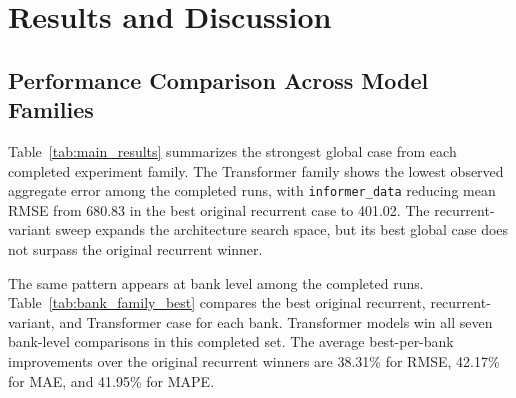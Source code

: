 \section{Results and Discussion}

\subsection{Performance Comparison Across Model Families}
Table~\ref{tab:main_results} summarizes the strongest global case from each completed experiment family. The Transformer family shows the lowest observed aggregate error among the completed runs, with \texttt{informer\_data} reducing mean RMSE from 680.83 in the best original recurrent case to 401.02. The recurrent-variant sweep expands the architecture search space, but its best global case does not surpass the original recurrent winner.

\begin{table}[t]
\centering
\caption{Global best case by model family (mean over 7 banks and 5 seeds).}
\label{tab:main_results}
\footnotesize
\setlength{\tabcolsep}{3pt}
\end{table}

The same pattern appears at bank level among the completed runs. Table~\ref{tab:bank_family_best} compares the best original recurrent, recurrent-variant, and Transformer case for each bank. Transformer models win all seven bank-level comparisons in this completed set. The average best-per-bank improvements over the original recurrent winners are 38.31\% for RMSE, 42.17\% for MAE, and 41.95\% for MAPE.

